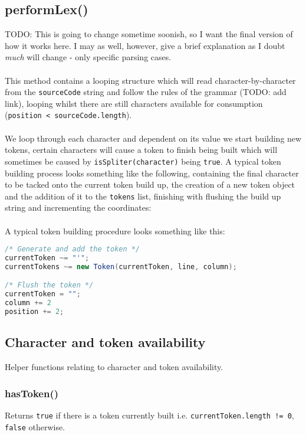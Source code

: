 \subsection{performLex()}

TODO: This is going to change sometime soonish, so I want the final
version of how it works here. I may as well, however, give a brief
explanation as I doubt \emph{much }will change - only specific parsing
cases.\\
\\
This method contains a looping structure which will read character-by-character
from the \texttt{sourceCode} string and follow the rules of the grammar
(TODO: add link), looping whilst there are still characters available
for consumption (\texttt{position < sourceCode.length}).\\
\\
We loop through each character and dependent on its value we start
building new tokens, certain characters will cause a token to finish
being built which will sometimes be caused by \texttt{isSpliter(character)}
being \texttt{true}. A typical token building process looks something
like the following, containing the final character to be tacked onto
the current token build up, the creation of a new token object and
the addition of it to the \texttt{tokens} list, finishing with flushing
the build up string and incrementing the coordinates:\\
\\
A typical token building procedure looks something like this:\\
\begin{lstlisting}[language=Java]
/* Generate and add the token */
currentToken ~= "'";
currentTokens ~= new Token(currentToken, line, column);

/* Flush the token */
currentToken = "";
column += 2
position += 2;
\end{lstlisting}

\subsection{Character and token availability}

Helper functions relating to character and token availability.

\subsubsection{hasToken()}

Returns \texttt{true} if there is a token currently built i.e. \texttt{currentToken.length != 0},
\texttt{false} otherwise.

